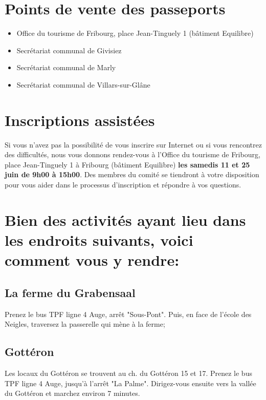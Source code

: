 \section*{Points de vente des passeports}

\begin{itemize}
\item Office du tourisme de Fribourg, place Jean-Tinguely 1 (bâtiment Equilibre)
\item Secrétariat communal de Givisiez
\item Secrétariat communal de Marly
\item Secrétariat communal de Villars-sur-Glâne
\end{itemize}

\section*{Inscriptions assistées}

Si vous n'avez pas la possibilité de vous inscrire sur Internet ou si vous rencontrez des difficultés, nous vous donnons rendez-vous à l'Office du tourisme de Fribourg, place Jean-Tinguely 1 à Fribourg (bâtiment Equilibre) \textbf{les samedis 11 et 25 juin de 9h00 à 15h00}. Des membres du comité se tiendront à votre disposition pour vous aider dans le processus d'inscription et répondre à vos questions. 


\section*{Bien des activités ayant lieu dans les endroits suivants, voici comment vous y rendre:}

\subsection*{La ferme du Grabensaal}

Prenez le bus TPF ligne 4 Auge, arrêt "Sous-Pont". Puis, en face de l'école des Neigles, traversez la passerelle qui mène à la ferme;

\subsection*{Gottéron}

Les locaux du Gottéron se trouvent au ch. du Gottéron 15 et 17. Prenez le bus TPF ligne 4 Auge, jusqu'à l'arrêt "La Palme". Dirigez-vous ensuite vers la vallée du Gottéron et marchez environ 7 minutes. 

